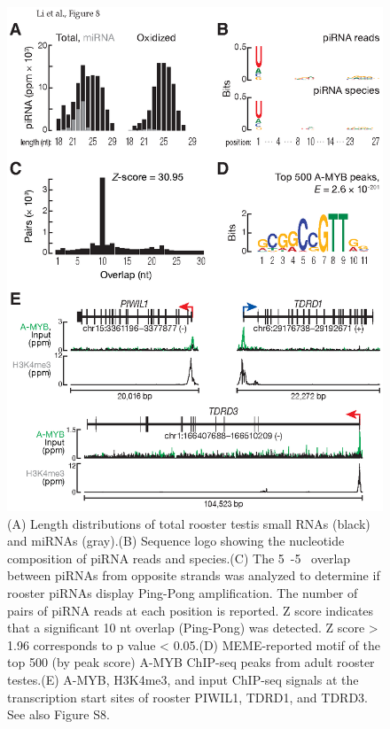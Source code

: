     \begin{figure}[htbp] %
      \centering 
      \includegraphics{Figures/MolCel/MolCel2013_Fig8.eps}
      \caption[Feed-Forward Regulation of piRNA Biogenesis by A-MYB is Conserved in Rooster]
      {
      	(A) Length distributions of total rooster testis small RNAs (black) and miRNAs (gray).(B) Sequence logo showing the nucleotide composition of piRNA reads and species.(C) The 5\textprime~-5\textprime~ overlap between piRNAs from opposite strands was analyzed to determine if rooster piRNAs display Ping-Pong amplification. The number of pairs of piRNA reads at each position is reported. Z score indicates that a significant 10 nt overlap (Ping-Pong) was detected. Z score > 1.96 corresponds to p value < 0.05.(D) MEME-reported motif of the top 500 (by peak score) A-MYB ChIP-seq peaks from adult rooster testes.(E) A-MYB, H3K4me3, and input ChIP-seq signals at the transcription start sites of rooster PIWIL1, TDRD1, and TDRD3. See also Figure S8.
      	}
      \label{fig:MolCelF8}
    	\end{figure}
